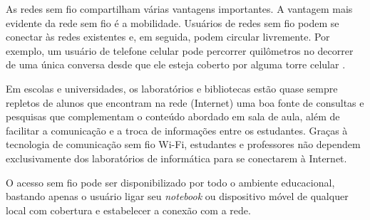 As redes sem fio compartilham várias vantagens importantes. A vantagem mais evidente da rede sem fio é a mobilidade. Usuários de redes sem fio podem se conectar às redes existentes e, em seguida, podem circular livremente. Por exemplo, um usuário de telefone celular pode percorrer quilômetros no decorrer de uma única conversa desde que ele esteja coberto por alguma torre celular \cite{gast2002}.


Em escolas e universidades, os laboratórios e bibliotecas estão quase sempre repletos de alunos que encontram na rede (Internet) uma boa fonte de consultas e pesquisas que complementam o conteúdo abordado em sala de aula, além de facilitar a comunicação e a troca de informações entre os estudantes. Graças à tecnologia de comunicação sem fio Wi-Fi, estudantes e professores não dependem exclusivamente dos laboratórios de informática para se conectarem à Internet.

O acesso sem fio pode ser disponibilizado por todo o ambiente educacional, bastando apenas o usuário ligar seu \textit{notebook} ou dispositivo móvel de qualquer local com cobertura e estabelecer a conexão com a rede.



